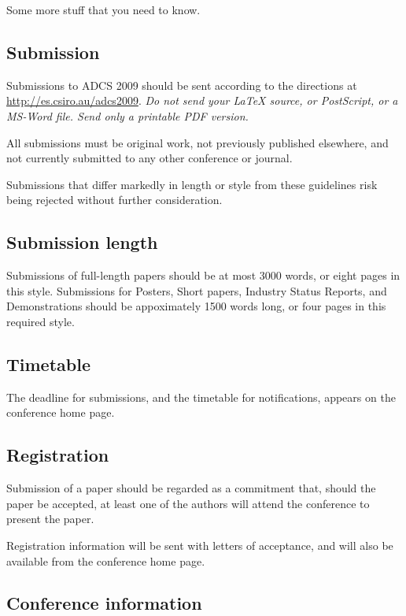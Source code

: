 \documentclass[twocolumn]{article}
\begin{document}
Some more stuff that you need to know.

\subsection{Submission}

Submissions to ADCS 2009 should be sent according to the directions at
\url{http://es.csiro.au/adcs2009}.  \emph{Do not send your {\LaTeX}
  source, or PostScript, or a MS-Word file.  Send only a printable PDF
  version.}

All submissions must be original work, not previously published 
elsewhere, and not currently submitted to any other conference or
journal.

Submissions that differ markedly in length or style from these
guidelines risk being rejected without further consideration.

\subsection{Submission length}

Submissions of full-length papers should be at most 3000 words, or
eight pages in this style.  Submissions for Posters, Short papers,
Industry Status Reports, and Demonstrations should be appoximately
1500 words long, or four pages in this required style.

\subsection{Timetable}

The deadline for submissions, and the timetable for notifications,
appears on the conference home page.

\subsection{Registration}

Submission of a paper should be regarded as a commitment that, should
the paper be accepted, at least one of the authors will attend the
conference to present the paper.

Registration information will be sent with letters of acceptance, and
will also be available from the conference home page.

\subsection{Conference information}
\end{document}
